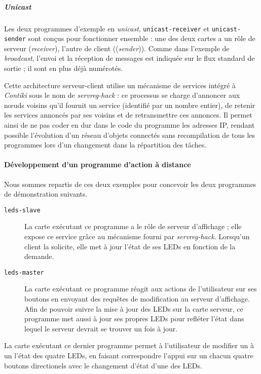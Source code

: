 \subparagraph{\textit{Unicast}}

Les deux programmes d’exemple en \textit{unicast}, \texttt{unicast-receiver} et \texttt{unicast-sender} sont conçus pour fonctionner ensemble : une des deux cartes a un rôle de serveur (\textit{receiver}), l’autre de client ((\textit{sender})).
Comme dans l’exemple de \textit{broadcast}, l’envoi et la réception de messages est indiquée sur le flux standard de sortie ; il sont en plus déjà numérotés.

Cette architecture serveur-client utilise un mécanisme de services intégré à \emph{Contiki} sous le nom de \emph{servreg-hack} : ce processus se charge d’annoncer aux nœuds voisins qu’il fournit un service (identifié par un nombre entier), de retenir les services annoncés par ses voisins et de retransmettre ces annonces.
Il permet ainsi de ne pas coder en dur dans le code du programme les adresses IP, rendant possible l’évolution d’un réseau d’objets connectés sans recompilation de tous les programmes lors d’un changement dans la répartition des tâches.

\paragraph{Développement d’un programme d’action à distance}

Nous sommes repartis de ces deux exemples pour concevoir les deux programmes de démonstration suivants.

\begin{description}
	\item[\texttt{leds-slave}]
		La carte exécutant ce programme a le rôle de serveur d’affichage ; elle expose ce service grâce au mécanisme fourni par \emph{servreg-hack}.
		Lorsqu’un client la solicite, elle met à jour l’état de ses LEDs en fonction de la demande.
	\item[\texttt{leds-master}]
		La carte exécutant ce programme réagit aux actions de l’utilisateur sur ses boutons en envoyant des requêtes de modification au serveur d’affichage.
		Afin de pouvoir suivre la mise à jour des LEDs sur la carte serveur, ce programme met aussi à jour ses propres LEDs pour refléter l’état dans lequel le serveur devrait se trouver un fois à jour.
\end{description}

La carte exécutant ce dernier programme permet à l’utilisateur de modifier un à un l’état des quatre LEDs, en faisant correspondre l’appui sur un chacun quatre boutons directionels avec le changement d’état d’une des LEDs.

